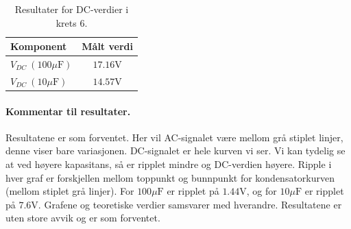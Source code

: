 \begin{table}[H]
\centering
\caption{Resultater for DC-verdier i krets 6.}
\label{tab:krets6_dc_verdi_transformator}
\begin{tabular}{lc}
\toprule
\textbf{Komponent} & \textbf{Målt verdi} \\
\midrule

$V_{DC} \: \left(100\mu\text{F}\right)$ & $17.16\text{V}$ \\
$V_{DC} \: \left(10\mu\text{F}\right)$ & $14.57\text{V}$ \\



\bottomrule
\end{tabular}
\end{table}



\paragraph{Kommentar til resultater. } Resultatene er som forventet. Her vil AC-signalet være mellom grå stiplet linjer, denne viser bare variasjonen. DC-signalet er hele kurven vi ser. Vi kan tydelig se at ved høyere kapasitans, så er ripplet mindre og DC-verdien høyere. Ripple i hver graf er forskjellen mellom toppunkt og bunnpunkt for kondensatorkurven (mellom stiplet grå linjer). For $100\mu\text{F}$ er ripplet på $1.44\mathrm{V}$, og for $10\mu\text{F}$ er ripplet på $7.6\mathrm{V}$. Grafene og teoretiske verdier samsvarer med hverandre. Resultatene er uten store avvik og er som forventet.

